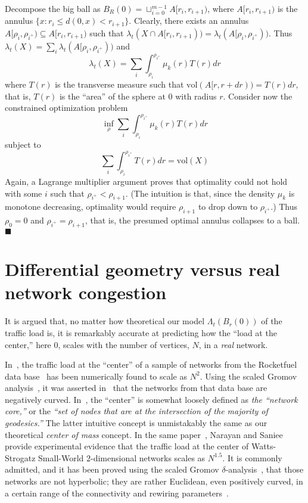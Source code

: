 \documentclass{article}
\newcommand{\vol}{\mathrm{vol}}
\newenvironment{proof}
{\noindent {\bf Proof.}}
{$\blacksquare$}
\begin{document}
\begin{proof}
Decompose the big ball as $B_R(0)=\sqcup_{i=0}^{m-1} A[r_i,r_{i+1})$, 
where $A[r_i,r_{i+1})$ is the annulus $\{x: r_i \leq d(0,x) < r_{i+1}\}$. 
Clearly, there exists an annulus $A[\rho_i,\rho_{i^+}) \subseteq A[r_i,r_{i+1})$ 
such that $\lambda_t(X \cap A[r_i,r_{i+1}))=\lambda_t(A[\rho_i,\rho_{i^+}))$. 
Thus $\lambda_t(X)=\sum_i \lambda_t(A[\rho_i,\rho_{i^+}))$ and  
$$\lambda_t(X)=\sum_i \int_{\rho_i}^{\rho_{i^+}} \mu_k(r) T(r)dr $$
where $T(r)$ is the transverse measure such that $\vol(A[r,r+dr))=T(r)dr$, 
that is, $T(r)$ is the ``area'' of the sphere at $0$ with radius $r$.  
Consider now the constrained optimization problem
$$ \inf_{\rho} \sum_i \int_{\rho_i}^{\rho_{i^+}} \mu_k(r) T(r)dr $$
subject to
$$ \sum_i \int_{\rho_i}^{\rho_{i^+}} T(r)dr =\vol(X) $$
Again, a Lagrange multiplier argument proves that optimality could not hold 
with some $i$ such that $\rho_{i^+} < \rho_{i+1}$. (The intuition is that,  
since the density $\mu_k$ is monotone decreasing, optimality would require $\rho_{i+1}$  
to drop down to $\rho_{i^+}$.) Thus $\rho_0=0$ and $\rho_{i^+}=\rho_{i+1}$, that is, the presumed optimal annulus 
collapses to a ball.
\end{proof}



\noindent 

\noindent 
\section{Differential geometry versus real network congestion}
\label{s:real_networks}

It is argued that, no matter how theoretical our model $\Lambda _{t} (B_r(0))$ of the traffic load is, 
it is remarkably accurate at predicting how the ``load at the center,'' here $0$, scales with the number of vertices, $N$, 
in a \textit{real} network. 

In~\cite{arXiv_dmitri}, 
the traffic load at the ``center'' of a sample of networks from the Rocketfuel data base~\cite{rocketfuel} 
has been numerically found to scale as $N^{2}$. 
Using the scaled Gromov analysis~\cite{scaled_gromov}, 
it was asserted in~\cite{arXiv_dmitri} that the networks from that data base are negatively curved. 
In~\cite{arXiv_dmitri}, the ``center'' is somewhat loosely defined as \textit{the ``network core,''} 
or the \textit{``set of nodes that are at the intersection of the majority of geodesics.''}  
The latter intuitive concept is unmistakably the same as our theoretical \textit{center of mass} concept. 
In the same paper~\cite{arXiv_dmitri}, Narayan and Saniee provide experimental evidence that the traffic load at the center of Watts-Strogatz Small-World $2$-dimensional networks scales as $N^{1.5}$. It is commonly admitted, and it has been proved using the scaled Gromov $\delta$-analysis~\cite{scaled_gromov}, that those networks are not hyperbolic; they are rather Euclidean, even positively curved, in a certain range of the connectivity and rewiring parameters~\cite[Sec. 6.4.2]{Matt_thesis}.
\end{document}
